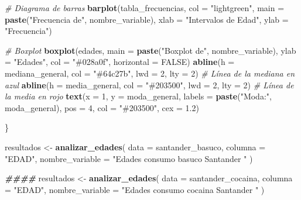 \documentclass[
]{article}
\newenvironment{Shaded}{\begin{snugshade}}{\end{snugshade}}
\newcommand{\AttributeTok}[1]{\textcolor[rgb]{0.13,0.29,0.53}{#1}}
\newcommand{\CommentTok}[1]{\textcolor[rgb]{0.56,0.35,0.01}{\textit{#1}}}
\newcommand{\ConstantTok}[1]{\textcolor[rgb]{0.56,0.35,0.01}{#1}}
\newcommand{\DecValTok}[1]{\textcolor[rgb]{0.00,0.00,0.81}{#1}}
\newcommand{\DocumentationTok}[1]{\textcolor[rgb]{0.56,0.35,0.01}{\textbf{\textit{#1}}}}
\newcommand{\FloatTok}[1]{\textcolor[rgb]{0.00,0.00,0.81}{#1}}
\newcommand{\FunctionTok}[1]{\textcolor[rgb]{0.13,0.29,0.53}{\textbf{#1}}}
\newcommand{\NormalTok}[1]{#1}
\newcommand{\OtherTok}[1]{\textcolor[rgb]{0.56,0.35,0.01}{#1}}
\newcommand{\StringTok}[1]{\textcolor[rgb]{0.31,0.60,0.02}{#1}}
\begin{document}
\begin{Shaded}
\begin{Highlighting}[]
  \CommentTok{\# Diagrama de barras}
  \FunctionTok{barplot}\NormalTok{(tabla\_frecuencias, }
          \AttributeTok{col =} \StringTok{"lightgreen"}\NormalTok{, }
          \AttributeTok{main =} \FunctionTok{paste}\NormalTok{(}\StringTok{"Frecuencia de"}\NormalTok{, nombre\_variable), }
          \AttributeTok{xlab =} \StringTok{"Intervalos de Edad"}\NormalTok{, }
          \AttributeTok{ylab =} \StringTok{"Frecuencia"}\NormalTok{)}
  
  \CommentTok{\# Boxplot}
  \FunctionTok{boxplot}\NormalTok{(edades, }
          \AttributeTok{main =} \FunctionTok{paste}\NormalTok{(}\StringTok{"Boxplot de"}\NormalTok{, nombre\_variable), }
          \AttributeTok{ylab =} \StringTok{"Edades"}\NormalTok{, }
          \AttributeTok{col =} \StringTok{"\#028a0f"}\NormalTok{, }
          \AttributeTok{horizontal =} \ConstantTok{FALSE}\NormalTok{)}
  \FunctionTok{abline}\NormalTok{(}\AttributeTok{h =}\NormalTok{ mediana\_general, }\AttributeTok{col =} \StringTok{"\#64c27b"}\NormalTok{, }\AttributeTok{lwd =} \DecValTok{2}\NormalTok{, }\AttributeTok{lty =} \DecValTok{2}\NormalTok{)  }\CommentTok{\# Línea de la mediana en azul}
  \FunctionTok{abline}\NormalTok{(}\AttributeTok{h =}\NormalTok{ media\_general, }\AttributeTok{col =} \StringTok{"\#203500"}\NormalTok{, }\AttributeTok{lwd =} \DecValTok{2}\NormalTok{, }\AttributeTok{lty =} \DecValTok{2}\NormalTok{)  }\CommentTok{\# Línea de la media en rojo}
  \FunctionTok{text}\NormalTok{(}\AttributeTok{x =} \DecValTok{1}\NormalTok{, }\AttributeTok{y =}\NormalTok{ moda\_general, }\AttributeTok{labels =} \FunctionTok{paste}\NormalTok{(}\StringTok{"Moda:"}\NormalTok{, moda\_general), }\AttributeTok{pos =} \DecValTok{4}\NormalTok{, }\AttributeTok{col =} \StringTok{"\#203500"}\NormalTok{, }\AttributeTok{cex =} \FloatTok{1.2}\NormalTok{)}
  
\NormalTok{\}}

\NormalTok{resultados }\OtherTok{\textless{}{-}} \FunctionTok{analizar\_edades}\NormalTok{(}
  \AttributeTok{data =}\NormalTok{ santander\_basuco,}
  \AttributeTok{columna =} \StringTok{"EDAD"}\NormalTok{, }
  \AttributeTok{nombre\_variable =} \StringTok{"Edades consumo basuco Santander "}  
\NormalTok{)}

\DocumentationTok{\#\#\#\#}
\NormalTok{resultados }\OtherTok{\textless{}{-}} \FunctionTok{analizar\_edades}\NormalTok{(}
  \AttributeTok{data =}\NormalTok{ santander\_cocaina,}
  \AttributeTok{columna =} \StringTok{"EDAD"}\NormalTok{, }
  \AttributeTok{nombre\_variable =} \StringTok{"Edades consumo cocaina Santander "}  
\NormalTok{)}


\end{Highlighting}
\end{Shaded}
\end{document}
